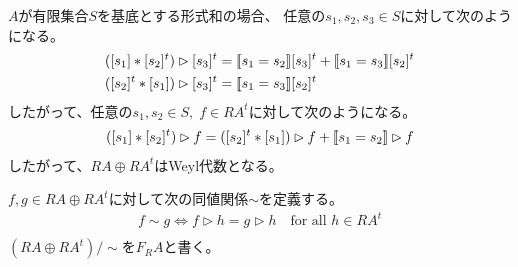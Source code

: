 	\begin{example}[定義域が形式和の場合の積]\label{eg:定義域が形式和の場合の積} %
		$A$が有限集合$S$を基底とする形式和の場合、
		任意の$s_1,s_2,s_3\in S$に対して次のようになる。
		\begin{equation*}\begin{split} %
			([s_1]*[s_2]^t)\rhd [s_3]^t &= \jump{s_1=s_2}[s_3]^t + \jump{s_1=s_3}[s_2]^t \\
			([s_2]^t*[s_1])\rhd [s_3]^t &= \jump{s_1=s_3}[s_2]^t \\
		\end{split}\end{equation*} %
		したがって、任意の$s_1,s_2\in S,\;f\in RA^t$に対して次のようになる。
		\begin{equation*}\begin{split} %
			([s_1]*[s_2]^t)\rhd f &= ([s_2]^t*[s_1])\rhd f + \jump{s_1=s_2}\rhd f \\
		\end{split}\end{equation*} %
		したがって、$RA\oplus RA^t$はWeyl代数となる。
	\end{example} %

	$f,g\in RA\oplus RA^t$に対して次の同値関係$\sim$を定義する。
	\begin{equation}\begin{split} %
		f\sim g \iff f\rhd h = g\rhd h \quad\text{for all }h\in RA^t \\
	\end{split}\end{equation} %
	$(RA\oplus RA^t)/\sim$を$F_RA$と書く。

